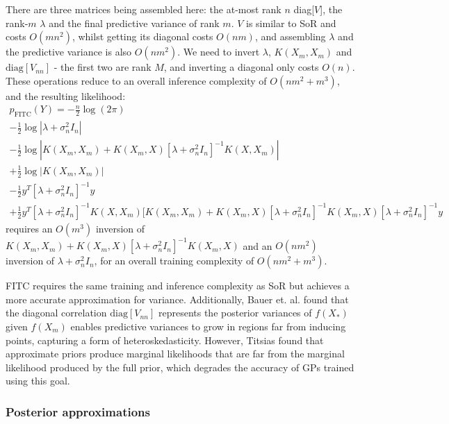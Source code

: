 There are three matrices being assembled here: the at-most rank $n$ diag[$V$], the rank-$m$ $\lambda$ and the final predictive variance of rank $m$. $V$ is similar to SoR and costs $O(mn^2)$, whilst getting its diagonal costs $O(nm)$, and assembling $\lambda$ and the predictive variance is also $O(nm^2)$. We need to invert $\lambda$, $K(X_m, X_m)$ and $\text{diag}[V_{nn}]$ - the first two are rank $M$, and inverting a diagonal only costs $O(n)$. These operations reduce to an overall inference complexity of $O(nm^2 + m^3)$, and the resulting likelihood:
\begin{equation*}
    \begin{aligned}
        p_{\text{FITC}}(Y) = -\frac{n}{2} \log(2 \pi) \\
        - \frac{1}{2} \log | \lambda + \sigma_n^2 I_n | \\
        - \frac{1}{2} \log | K(X_m, X_m) + K(X_m, X) [\lambda + \sigma_n^2 I_n]^{-1} K(X, X_m) | \\
        + \frac{1}{2} \log | K(X_m, X_m) | \\
        - \frac{1}{2} y^T [\lambda + \sigma_n^2 I_n]^{-1} y \\
        + \frac{1}{2} y^T [\lambda + \sigma_n^2 I_n]^{-1} K(X, X_m) [K(X_m, X_m) + K(X_m, X) [\lambda + \sigma_n^2 I_n]^{-1} K(X_m, X) [\lambda + \sigma_n^2 I_n]^{-1} y
    \end{aligned}
\end{equation*}
requires an $O(m^3)$ inversion of $K(X_m, X_m) + K(X_m, X) [\lambda + \sigma_n^2 I_n]^{-1} K(X_m, X)$ and an $O(nm^2)$ inversion of $\lambda + \sigma_n^2 I_n$, for an overall training complexity of $O(nm^2 + m^3)$.

FITC requires the same training and inference complexity as SoR but achieves a more accurate approximation for variance. Additionally, Bauer et. al. \cite{fitc-heteroskedasticity} found that the diagonal correlation $\text{diag}[V_{nn}]$ represents the posterior variances of $f(X_*)$ given $f(X_m)$ enables predictive variances to grow in regions far from inducing points, capturing a form of heteroskedasticity. However, Titsias \cite{vfe} found that approximate priors produce marginal likelihoods that are far from the marginal likelihood produced by the full prior, which degrades the accuracy of GPs trained using this goal. 

\subsubsection{Posterior approximations}

